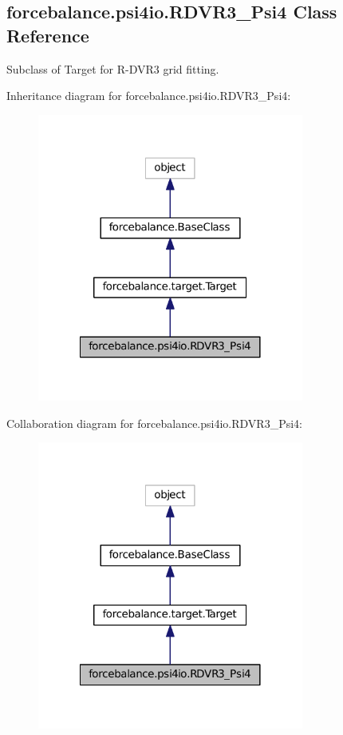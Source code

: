 \hypertarget{classforcebalance_1_1psi4io_1_1RDVR3__Psi4}{\subsection{forcebalance.\-psi4io.\-R\-D\-V\-R3\-\_\-\-Psi4 Class Reference}
\label{classforcebalance_1_1psi4io_1_1RDVR3__Psi4}
}


Subclass of Target for R-\/\-D\-V\-R3 grid fitting.  




Inheritance diagram for forcebalance.\-psi4io.\-R\-D\-V\-R3\-\_\-\-Psi4\-:
\nopagebreak
\begin{figure}[H]
\begin{center}
\leavevmode
\includegraphics[width=248pt]{classforcebalance_1_1psi4io_1_1RDVR3__Psi4__inherit__graph}
\end{center}
\end{figure}


Collaboration diagram for forcebalance.\-psi4io.\-R\-D\-V\-R3\-\_\-\-Psi4\-:
\nopagebreak
\begin{figure}[H]
\begin{center}
\leavevmode
\includegraphics[width=248pt]{classforcebalance_1_1psi4io_1_1RDVR3__Psi4__coll__graph}
\end{center}
\end{figure}
